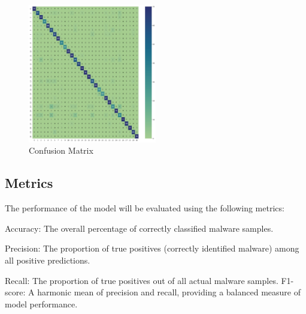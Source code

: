 \documentclass[conference]{IEEEtran}
\begin{document}
\begin{figure}[ht] %
  \centering %
  \includegraphics[width=0.5\textwidth]{confusionmatrixf.jpeg} %
  \caption{Confusion Matrix} %
  \label{fig:example6} %
\end{figure}

\subsection{ Metrics}
The performance of the model will be evaluated using the following metrics:

    Accuracy: The overall percentage of correctly classified malware samples.
    
    Precision: The proportion of true positives (correctly identified malware) among all positive predictions.
    
    Recall: The proportion of true positives out of all actual malware samples.
    F1-score: A harmonic mean of precision and recall, providing a balanced measure of model performance.






\setlength{\parskip}{10pt}
\end{document}
